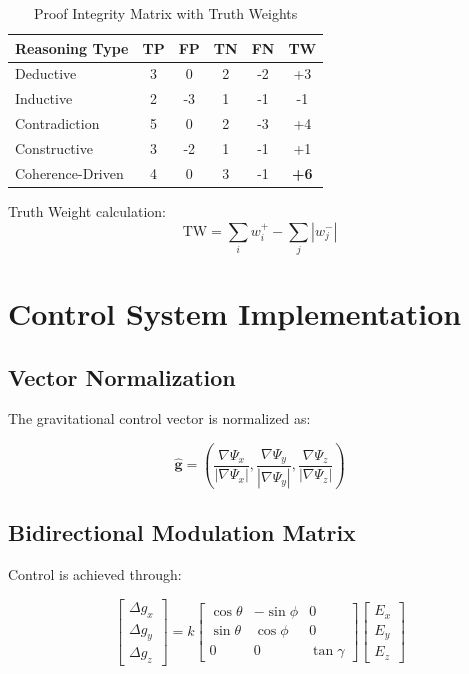 \documentclass{article}
\begin{document}
\begin{table}[h]
\centering
\caption{Proof Integrity Matrix with Truth Weights}
\begin{tabular}{@{}lccccc@{}}
\toprule
\textbf{Reasoning Type} & \textbf{TP} & \textbf{FP} & \textbf{TN} & \textbf{FN} & \textbf{TW} \\
\midrule
Deductive & 3 & 0 & 2 & -2 & +3 \\
Inductive & 2 & -3 & 1 & -1 & -1 \\
Contradiction & 5 & 0 & 2 & -3 & +4 \\
Constructive & 3 & -2 & 1 & -1 & +1 \\
Coherence-Driven & 4 & 0 & 3 & -1 & \textbf{+6} \\
\bottomrule
\end{tabular}
\end{table}

Truth Weight calculation:
\begin{equation}
\text{TW} = \sum_{i} w_i^{+} - \sum_{j} |w_j^{-}|
\end{equation}

\section{Control System Implementation}

\subsection{Vector Normalization}

The gravitational control vector is normalized as:

\begin{equation}
\hat{\mathbf{g}} = \left( \frac{\nabla \Psi_x}{|\nabla \Psi_x|}, \frac{\nabla \Psi_y}{|\nabla \Psi_y|}, \frac{\nabla \Psi_z}{|\nabla \Psi_z|} \right)
\end{equation}

\subsection{Bidirectional Modulation Matrix}

Control is achieved through:

\begin{equation}
\begin{bmatrix}
\Delta g_x \\ \Delta g_y \\ \Delta g_z
\end{bmatrix} = k \begin{bmatrix}
\cos\theta & -\sin\phi & 0 \\
\sin\theta & \cos\phi & 0 \\
0 & 0 & \tan\gamma
\end{bmatrix} \begin{bmatrix}
E_x \\ E_y \\ E_z
\end{bmatrix}
\end{equation}
\end{document}
